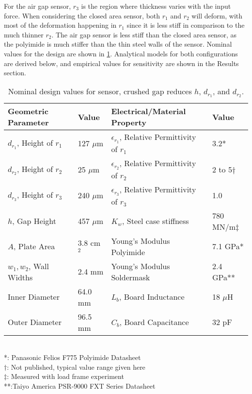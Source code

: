 For the air gap sensor, $r_3$ is the region where thickness varies with the input force.
When considering the closed area sensor, both $r_1$ and $r_2$ will deform, with most of the
deformation happening in $r_1$ since it is less stiff in comparison to the much thinner $r_2$. 
The air gap sensor is less stiff than the closed area sensor, as the polyimide is 
much stiffer than the thin steel walls of the sensor.
Nominal values for the design are shown in \ref{tab:values}.
Analytical models for both configurations are derived below,
 and empirical values for sensitivity are shown in the Results section.

\begin{table}[]
{\centering
\caption{Nominal design values for sensor, crushed gap reduces $h$, $d_{r_1}$, and $d_{r_2}$.}
\label{tab:values}
\begin{tabular}{|l|l||l|l|}
\hline
Geometric Parameter & Value & Electrical/Material Property & Value \\ \hline
$d_{r_1}$, Height of $r_1$    & 127 $\mu$m & $\epsilon_{r_1}$, Relative Permittivity of $r_1$ & 3.2*  \\ \hline
$d_{r_2}$, Height of $r_2$    & 25  $\mu$m  & $\epsilon_{r_2}$, Relative Permittivity of $r_2$ & 2 to 5$\dagger$  \\ \hline
$d_{r_3}$, Height of $r_3$    & 240 $\mu$m & $\epsilon_{r_3}$, Relative Permittivity of $r_3$ & 1.0  \\ \hline
$h$, Gap Height    & 457 $\mu$m   &   $K_w$, Steel case stiffness & 780 MN/m$\ddagger$       \\ \hline
$A$, Plate Area    & 3.8 cm$^2$   &  Young's Modulus Polyimide          & 7.1 GPa*         \\ \hline
$w_1, w_2$, Wall Widths   & 2.4 mm   &   Young's Modulus Soldermask  & 2.4 GPa** \\ \hline
Inner Diameter   & 64.0 mm   &     $L_b$, Board Inductance      & 18 $\mu$H    \\ \hline
Outer Diameter   & 96.5 mm &      $C_b$, Board Capacitance    & 32 pF             \\ \hline 
\end{tabular}
} \\ 
\footnotesize{*: Panasonic Felios F775 Polyimide Datasheet} \\
\footnotesize{$\dagger$: Not published, typical value range given here}\\
\footnotesize{$\ddagger$: Measured with load frame experiment}\\
\footnotesize{**:Taiyo America PSR-9000 FXT Series Datasheet}\\
\end{table}

